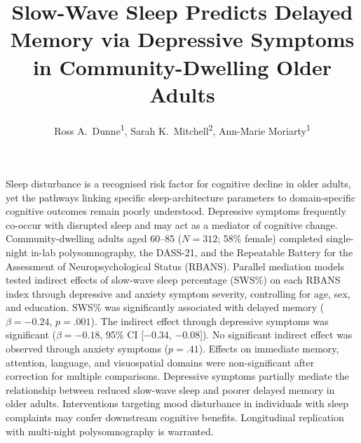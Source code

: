 \documentclass[palette=lancet, wordlimit=300]{rossabstract}
\title{Slow-Wave Sleep Predicts Delayed Memory via Depressive Symptoms
       in Community-Dwelling Older Adults}
\author{Ross A.\ Dunne\textsuperscript{1},
        Sarah K.\ Mitchell\textsuperscript{2},
        Ann-Marie Moriarty\textsuperscript{1}}
\affiliation{%
  \textsuperscript{1}Department of Psychology, University of Limerick;
  \textsuperscript{2}School of Medicine, Trinity College Dublin}
\begin{document}
\maketitle

\structuredabstract
  {Sleep disturbance is a recognised risk factor for cognitive decline in
   older adults, yet the pathways linking specific sleep-architecture
   parameters to domain-specific cognitive outcomes remain poorly
   understood. Depressive symptoms frequently co-occur with disrupted
   sleep and may act as a mediator of cognitive change.}
  {Community-dwelling adults aged 60--85 ($N = 312$; 58\% female) completed
   single-night in-lab polysomnography, the DASS-21, and the Repeatable
   Battery for the Assessment of Neuropsychological Status (RBANS).
   Parallel mediation models tested indirect effects of slow-wave sleep
   percentage (SWS\%) on each RBANS index through depressive and anxiety
   symptom severity, controlling for age, sex, and education.}
  {SWS\% was significantly associated with delayed memory
   ($\beta = -0.24$, $p = .001$). The indirect effect through depressive
   symptoms was significant ($\beta = -0.18$, 95\% CI [$-$0.34, $-$0.08]).
   No significant indirect effect was observed through anxiety symptoms
   ($p = .41$). Effects on immediate memory, attention, language, and
   visuospatial domains were non-significant after correction for
   multiple comparisons.}
  {Depressive symptoms partially mediate the relationship between reduced
   slow-wave sleep and poorer delayed memory in older adults. Interventions
   targeting mood disturbance in individuals with sleep complaints may
   confer downstream cognitive benefits. Longitudinal replication with
   multi-night polysomnography is warranted.}
\end{document}

